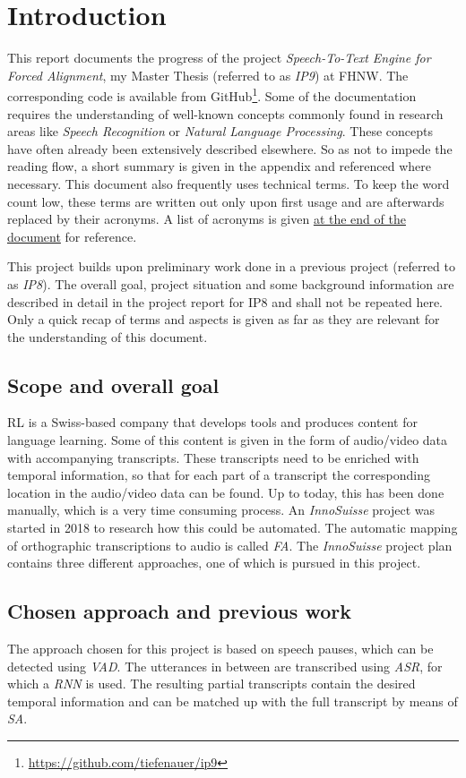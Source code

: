 \section{Introduction}\label{intro}
This report documents the progress of the project \textit{Speech-To-Text Engine for Forced Alignment}, my Master Thesis (referred to as \textit{IP9}) at \ac{FHNW}. The corresponding code is available from GitHub\footnote{\url{https://github.com/tiefenauer/ip9}}. Some of the documentation requires the understanding of well-known concepts commonly found in research areas like \textit{Speech Recognition} or \textit{Natural Language Processing}. These concepts have often already been extensively described elsewhere. So as not to impede the reading flow, a short summary is given in the appendix and referenced where necessary. This document also frequently uses technical terms. To keep the word count low, these terms are written out only upon first usage and are afterwards replaced by their acronyms. A list of acronyms is given \hyperref[acronyms]{at the end of the document} for reference.

This project builds upon preliminary work done in a previous project (referred to as \textit{IP8}). The overall goal, project situation and some background information are described in detail in the project report for IP8 and shall not be repeated here. Only a quick recap of terms and aspects is given as far as they are relevant for the understanding of this document.

\subsection{Scope and overall goal}
\ac{RL} is a Swiss-based company that develops tools and produces content for language learning. Some of this content is given in the form of audio/video data with accompanying transcripts. These transcripts need to be enriched with temporal information, so that for each part of a transcript the corresponding location in the audio/video data can be found. Up to today, this has been done manually, which is a very time consuming process. An \textit{InnoSuisse} project was started in 2018 to research how this could be automated. The automatic mapping of orthographic transcriptions to audio is called \textit{\ac{FA}}. The \textit{InnoSuisse} project plan contains three different approaches, one of which is pursued in this project.

\subsection{Chosen approach and previous work}
The approach chosen for this project is based on speech pauses, which can be detected using \textit{\ac{VAD}}. The utterances in between are transcribed using \textit{\ac{ASR}}, for which a \textit{\ac{RNN}} is used. The resulting partial transcripts contain the desired temporal information and can be matched up with the full transcript by means of \textit{\ac{SA}}.

